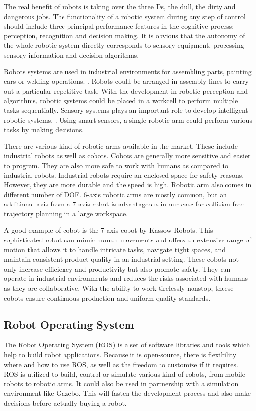 The real benefit of robots is taking over the three Ds, the dull, the dirty and dangerous jobs. \cite{jordan2016robots}
The functionality of a robotic system during any step of control should include three principal performance
features in the cognitive process: perception, recognition and decision making. 
It is obvious that the autonomy of the whole robotic system directly corresponds to sensory equipment, 
processing sensory information and decision algorithms. \cite{HAVLIK2011327}

Robots systems are used in industrial environments for assembling parts, painting cars or welding operations. \cite{SathishKumar2023, Wakizako}. Robots could be arranged in assembly lines to carry out a particular repetitive task. With the development in robotic perception and algorithms, robotic systems could be placed in a workcell to perform multiple tasks sequentially.
Sensory systems plays an important role to develop intelligent robotic systems. \cite{Wakizako}. Using smart sensors, a single robotic arm could perform various tasks by making decisions.

There are various  kind of robotic arms available in the market. These include industrial robots as well as cobots. Cobots are generally more sensitive and easier to program. They are also more safe to work with humans as compared to industrial robots. Industrial robots require an enclosed space for safety reasons. However, they are more durable and the speed is high. \cite{10201199}
Robotic arm also comes in different number of \hyperref[acro:DOF]{DOF}. 6-axis robotic arms are mostly common, but an additional axis from a 7-axis cobot is advantageous in our case for collision free trajectory planning in a large workspace. 

A good example of cobot is the 7-axis cobot by Kassow Robots. This sophisticated robot can mimic human movements and offers an extensive range of motion that allows it to handle intricate tasks, navigate tight spaces, and maintain consistent product quality in an industrial setting.
These cobots not only increase efficiency and productivity but also promote safety.
They can operate in industrial environments and reduces the risks associated with humans as they are collaborative. 
With the ability to work tirelessly nonstop, theese cobots ensure continuous production and uniform quality standards.
\cite{kassowrobotsblog}

\subsection{Robot Operating System}
\label{subsec:ROS}
The Robot Operating System (ROS) is a set of software libraries and tools which help to build robot applications. 
Because it is open-source, there is flexibility where and how to use ROS, as well as the freedom to customize if it requires. \cite{rosblog}
ROS is utilized to build, control or simulate various kind of robots, from mobile robots to robotic arms. \cite{koubaa2017robot}
It could also be used in partnership with a simulation environment like Gazebo. This will fasten the development process
and also make decisions before actually buying a robot. 

